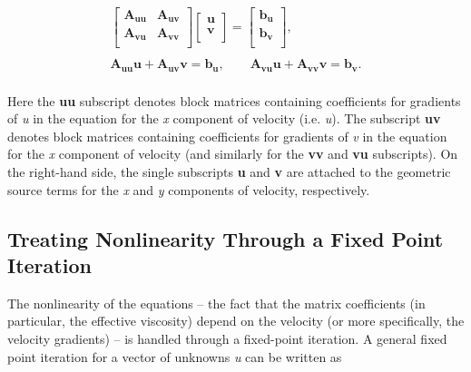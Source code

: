 \begin{equation}
  \begin{matrix}
    \left[ \begin{matrix}
        \mathbf{A}_{\mathbf{uu}} & \mathbf{A}_{\mathbf{uv}}  \\
        \mathbf{A}_{\mathbf{vu}} & \mathbf{A}_{\mathbf{vv}}  \\
      \end{matrix} \right]\left[ \begin{matrix}
        \mathbf{u}  \\
        \mathbf{v}  \\
      \end{matrix} \right]=\left[ \begin{matrix}
        \mathbf{b}_{\mathbf{u}}  \\
        \mathbf{b}_{\mathbf{v}}  \\
      \end{matrix} \right], \\ 
    \\ 
    \mathbf{A}_{\mathbf{uu}}\mathbf{u} + \mathbf{A}_{\mathbf{uv}}\mathbf{v} =\mathbf{b}_{\mathbf{u}},
    \quad \quad \mathbf{A}_{\mathbf{vu}}\mathbf{u} + \mathbf{A}_{\mathbf{vv}}\mathbf{v} =\mathbf{b}_{\mathbf{v}}. \\ 
  \end{matrix}
\end{equation}

\noindent
Here the \textbf{uu} subscript denotes block matrices containing coefficients for gradients of \textit{u} in the equation for the \textit{x} component of velocity (i.e. \textit{u}). The subscript \textbf{uv} denotes block matrices containing coefficients for gradients of \textit{v} in the equation for the \textit{x} component of velocity (and similarly for the \textbf{vv} and \textbf{vu} subscripts). On the right-hand side, the single subscripts \textbf{u} and \textbf{v} are attached to the geometric source terms for the \textit{x} and \textit{y} components of velocity, respectively.

\subsection{Treating Nonlinearity Through a Fixed Point Iteration}
The nonlinearity of the equations -- the fact that the matrix coefficients (in particular, the effective viscosity) depend
on the velocity (or more specifically, the velocity gradients) -- is handled through a fixed-point iteration. 
A general fixed point iteration for a vector of unknowns \textit{u} can be written as 

